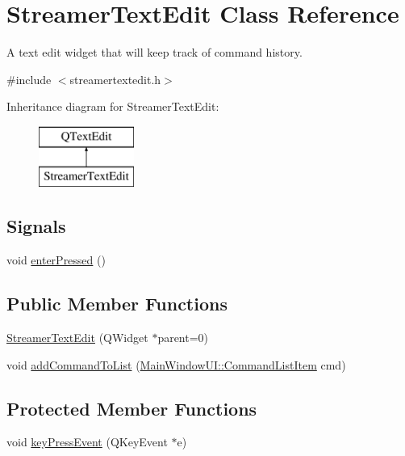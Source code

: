 \hypertarget{classStreamerTextEdit}{\section{Streamer\-Text\-Edit Class Reference}
\label{classStreamerTextEdit}
}


A text edit widget that will keep track of command history.  




{\ttfamily \#include $<$streamertextedit.\-h$>$}

Inheritance diagram for Streamer\-Text\-Edit\-:\begin{figure}[H]
\begin{center}
\leavevmode
\includegraphics[height=2.000000cm]{classStreamerTextEdit}
\end{center}
\end{figure}
\subsection*{Signals}
\begin{DoxyCompactItemize}
\item 
void \hyperlink{classStreamerTextEdit_aef9c5b51fb00edb2f984128e612629be}{enter\-Pressed} ()
\end{DoxyCompactItemize}
\subsection*{Public Member Functions}
\begin{DoxyCompactItemize}
\item 
\hyperlink{classStreamerTextEdit_a92180ec1922ebb95e6eee9f6463a4190}{Streamer\-Text\-Edit} (Q\-Widget $\ast$parent=0)
\item 
void \hyperlink{classStreamerTextEdit_ac89b399e38a953a0a1835259e91881df}{add\-Command\-To\-List} (\hyperlink{namespaceMainWindowUI_ab4a56a6d14c3fc1c53d1f1373a9033d3}{Main\-Window\-U\-I\-::\-Command\-List\-Item} cmd)
\end{DoxyCompactItemize}
\subsection*{Protected Member Functions}
\begin{DoxyCompactItemize}
\item 
void \hyperlink{classStreamerTextEdit_ad30da0518b808ace5b97f0a160a2f89c}{key\-Press\-Event} (Q\-Key\-Event $\ast$e)
\end{DoxyCompactItemize}


